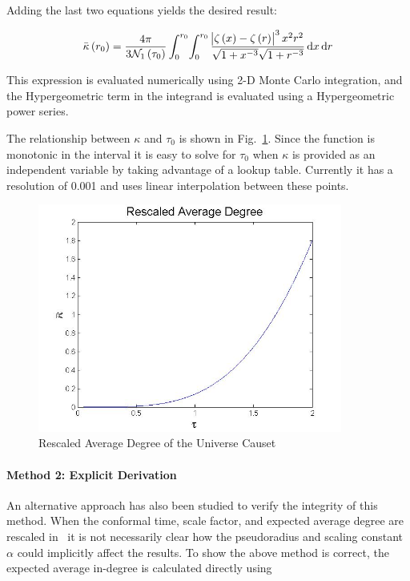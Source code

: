 \documentclass[preprint,notitlepage,amsmath,amssymb,floatfix]{revtex4-1}
\begin{document}
\noindent Adding the last two equations yields the desired result:

\begin{equation}
\label{eq:kappa}
\bar\kappa\left(r_0\right) = \frac{4\pi}{3\mathcal{N}_1\left(\tau_0\right)}\int_0^{r_0} \! \int_0^{r_0} \frac{\abs{\zeta\left(x\right) - \zeta\left(r\right)}^3 x^2 r^2}{\sqrt{1+x^{-3}}\sqrt{1+r^{-3}}}\,\mathrm dx\,\mathrm dr
\end{equation}

\noindent This expression is evaluated numerically using 2-D Monte Carlo integration, and the Hypergeometric term in the integrand is evaluated using a Hypergeometric power series. \par
The relationship between $\kappa$ and $\tau_0$ is shown in Fig.~\ref{fig:kappa_tau}.
Since the function is monotonic in the interval it is easy to solve for $\tau_0$ when $\kappa$ is provided as an independent variable by taking advantage of a lookup table.  
Currently it has a resolution of 0.001 and uses linear interpolation between these points.

\begin{figure}
\includegraphics[width=10cm]{figures/Rescaled_Average_Degree.jpg}
\caption{Rescaled Average Degree of the Universe Causet}
\label{fig:kappa_tau}
\centering
\end{figure}

\paragraph{Method 2: Explicit Derivation}
An alternative approach has also been studied to verify the integrity of this method.
When the conformal time, scale factor, and expected average degree are rescaled in~\cite{ref:snc2012} it is not necessarily clear how the pseudoradius and scaling constant $\alpha$ could implicitly affect the results.
To show the above method is correct, the expected average in-degree is calculated directly using
\end{document}
